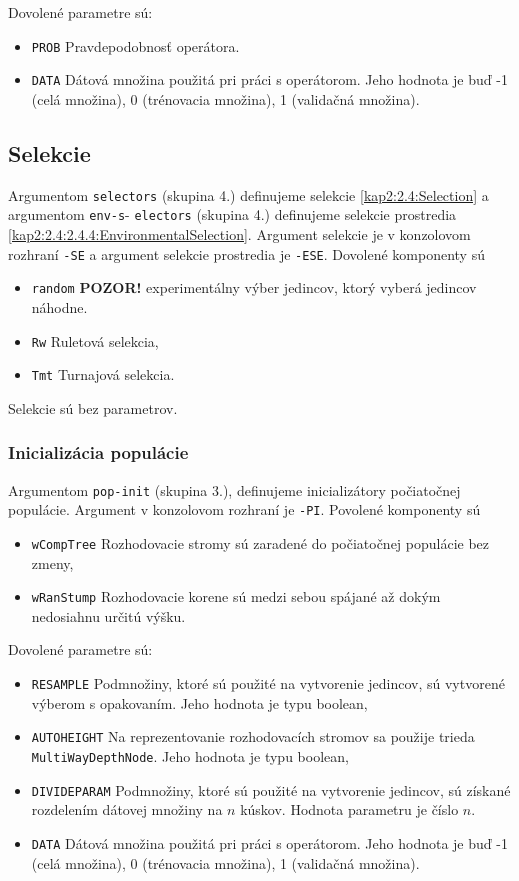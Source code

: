 Dovolené parametre sú:
\begin{itemize}
\item \verb|PROB| Pravdepodobnosť operátora.
\item \verb|DATA| Dátová množina použitá pri práci s operátorom. Jeho hodnota je buď -1 (celá množina), 0 (trénovacia množina), 1 (validačná množina).
\end{itemize}

\subsection*{Selekcie}
Argumentom \verb|selectors| (skupina 4.) definujeme selekcie \ref{kap2:2.4:Selection} a argumentom \verb|env-s|- \verb|electors| (skupina 4.) definujeme selekcie prostredia \ref{kap2:2.4:2.4.4:EnvironmentalSelection}. Argument selekcie je v konzolovom rozhraní \verb|-SE| a argument selekcie prostredia je \verb|-ESE|.
Dovolené komponenty sú 
\begin{itemize}
\item \verb|random| \textbf{POZOR!} experimentálny výber jedincov, ktorý vyberá jedincov náhodne.
\item \verb|Rw| Ruletová selekcia,
\item \verb|Tmt|  Turnajová selekcia.
\end{itemize}

Selekcie sú bez parametrov.

\subsubsection*{Inicializácia populácie}
Argumentom \verb|pop-init| (skupina 3.), definujeme inicializátory počiatočnej populácie. Argument v konzolovom rozhraní je \verb|-PI|.
Povolené komponenty sú 
\begin{itemize}
\item \verb|wCompTree| Rozhodovacie stromy sú zaradené do počiatočnej populácie bez zmeny,
\item \verb|wRanStump| Rozhodovacie korene sú medzi sebou spájané až dokým nedosiahnu určitú výšku.
\end{itemize}

Dovolené parametre sú:
\begin{itemize}
\item \verb|RESAMPLE| Podmnožiny, ktoré sú použité na vytvorenie jedincov, sú vytvorené výberom s opakovaním. Jeho hodnota je typu boolean,
\item \verb|AUTOHEIGHT| Na reprezentovanie rozhodovacích stromov sa použije trieda \verb|MultiWayDepthNode|. Jeho hodnota je typu boolean,
\item \verb|DIVIDEPARAM| Podmnožiny, ktoré sú použité na vytvorenie jedincov, sú získané rozdelením dátovej množiny na $n$ kúskov. Hodnota parametru je číslo $n$.
\item \verb|DATA| Dátová množina použitá pri práci s operátorom. Jeho hodnota je buď -1 (celá množina), 0 (trénovacia množina), 1 (validačná množina).
\end{itemize}

